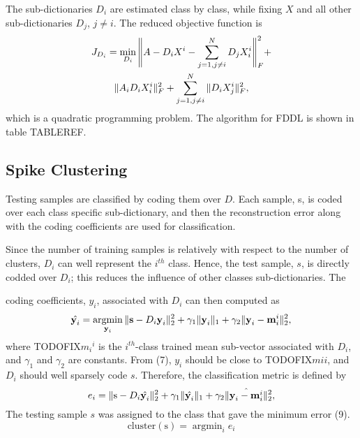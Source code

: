 \documentclass[conference]{IEEEtran}
\DeclareMathOperator*{\argmin}{argmin}
\begin{document}
	The sub-dictionaries $D_i$ are estimated class by class, while fixing $X$ and all other sub-dictionaries $D_j$, $j\neq i$. The reduced objective function is
	\begin{multline}
		J_{D_i}=\min_{D_i}\Bigg\Vert{A-D_iX^i-\sum_{j=1,j\neq i}^{N}D_jX_i^i}\Bigg\Vert_F^2 + \\
		\Vert{A_iD_iX_i^i}\Vert_F^2+\sum_{j=1,j\neq i}^{N}\Vert{D_iX_j^i}\Vert_F^2,
	\end{multline}
	which is a quadratic programming problem. The algorithm for FDDL is shown in table TABLEREF.
	
	\subsection{Spike Clustering}
	Testing samples are classified by coding them over $D$. Each sample, s, is coded over each class specific sub-dictionary, and then the reconstruction error along with the coding coefficients are used for classification.
	
	Since the number of training samples is relatively with respect to the number of clusters, $D_i$ can well represent the $i^{th}$ class. Hence, the test sample, $s$, is directly codded over $D_i$; this reduces the influence of other classes sub-dictionaries. The
	
	 
	coding coefficients, $y_i$, associated with $D_i$ can then computed as
	\begin{equation}
		\hat{\textbf{y}_i}=\argmin_{\textbf{y}_i}\paralleled{\textbf{s}-D_i\textbf{y}_i}_2^2+\gamma_1\paralleled{\textbf{y}_i}_1+\gamma_2\paralleled{\textbf{y}_i-\textbf{m}_i^i}_2^2,
	\end{equation}
	where TODOFIX${m_i}^i$ is the $i^{th}$-class trained mean sub-vector associated with $D_i$, and $\gamma_1$ and $\gamma_2$ are constants. From (7), $y_i$ should be close to TODOFIX$mi i$, and $D_i$ should well sparsely code $s$. Therefore, the classification metric is defined by
	\begin{equation}
		e_i=\Vert{\text{s}-D_i\hat{\textbf{y}_i}}\Vert_2^2+\gamma_1\Vert{\hat{\textbf{y}_i}}\Vert_1+\gamma_2\Vert{\hat{\textbf{y}_i-\textbf{m}_i^i}}\Vert_2^2,
	\end{equation}
	The testing sample $s$ was assigned to the class that gave the minimum error (9).
	\begin{equation}
		\mathrm{cluster(s)}=\argmin_ie_i
	\end{equation}
	
\end{document}
